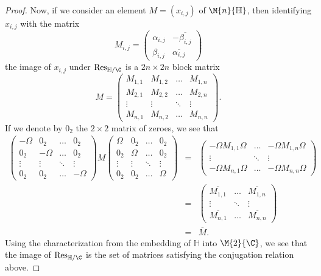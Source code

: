 \documentclass[10pt]{amsart}
\begin{document}
\begin{ex}
\begin{proof}
    Now, if we consider an element $M = \left(x_{i,j}\right)$ of $\M{n}{\mathbb{H}}$, then identifying $x_{i,j}$ with the matrix
    $$M_{i,j} = \left(\begin{matrix}
      \alpha_{i,j} & -\overline{\beta_{i,j}}\\
      \beta_{i,j} & \overline{\alpha_{i,j}}
    \end{matrix}\right)$$
    the image of $x_{i,j}$ under $\operatorname{Res}_{\mathbb{H}/\C}$ is a $2n \times 2n$ block matrix
    $$M = \left(\begin{matrix}
      M_{1,1} & M_{1,2} & \ldots & M_{1,n}\\
      M_{2,1} & M_{2,2} & \ldots & M_{2,n}\\
      \vdots & \vdots & \ddots & \vdots\\
      M_{n,1} & M_{n,2} & \ldots & M_{n,n}
    \end{matrix}\right).$$
    If we denote by $0_2$ the $2 \times 2$ matrix of zeroes, we see that
    \begin{eqnarray*}
      \left(\begin{matrix}
      -\Omega &  0_2 & \ldots & 0_2\\
      0_2 & -\Omega & \ldots & 0_2\\
      \vdots & \vdots & \ddots & \vdots\\
      0_2 & 0_2 & \ldots & -\Omega
    \end{matrix}\right)
    M
    \left(\begin{matrix}
      \Omega &  0_2 & \ldots & 0_2\\
      0_2 & \Omega & \ldots & 0_2\\
      \vdots & \vdots & \ddots & \vdots\\
      0_2 & 0_2 & \ldots & \Omega
    \end{matrix}\right)
    &=&
    \left(\begin{matrix}
        -\Omega M_{1,1}\Omega & \ldots & -\Omega M_{1,n}\Omega\\
        \vdots & \ddots & \vdots\\
        -\Omega M_{n,1} \Omega & \ldots & -\Omega M_{n,n} \Omega
      \end{matrix}\right)\\
    &=& 
    \left(\begin{matrix}
      \overline{M_{1,1}} & \ldots & \overline{M_{1,n}}\\
        \vdots & \ddots & \vdots\\
        \overline{M_{n,1}} & \ldots & \overline{M_{n,n}}
      \end{matrix}\right)\\
    &=& \overline{M}.
    \end{eqnarray*}
    Using the characterization from the embedding of $\mathbb{H}$ into $\M{2}{\C}$, we see that the image of $\operatorname{Res}_{\mathbb{H}/\C}$ is the set of matrices satisfying the conjugation relation above.
  \end{proof}
\end{ex}
\end{document}
